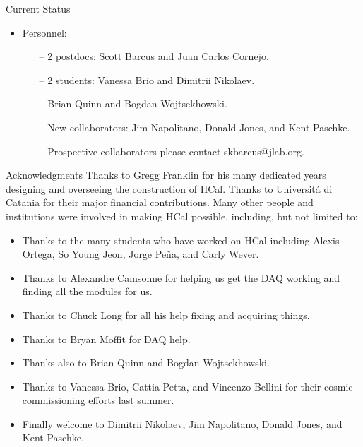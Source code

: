 \documentclass[10pt]{beamer}
\newcommand{\hcal}{HCal}
\begin{document}
\begin{frame}{Current Status}
	\begin{itemize}
		\item \alert{Personnel:}
			\begin{itemize}
				\item[--] 2 postdocs: \alert{Scott Barcus} and \alert{Juan Carlos Cornejo}.
				\item[--] 2 students: \alert{Vanessa Brio} and \alert{Dimitrii Nikolaev}.
				\item[--] \alert{Brian Quinn} and \alert{Bogdan Wojtsekhowski}.
				\item[--] New collaborators: \alert{Jim Napolitano}, \alert{Donald Jones}, and \alert{Kent Paschke}.
				\item[--] Prospective collaborators please contact \alert{skbarcus@jlab.org}.
			\end{itemize}
	\end{itemize}

\end{frame}

\begin{frame}{Acknowledgments}
Thanks to \alert{Gregg Franklin} for his many dedicated years designing and overseeing the construction of {\hcal}. Thanks to \alert{Universit\'{a} di Catania} for their major financial contributions. Many other people and institutions were involved in making {\hcal} possible, including, but not limited to:
    \begin{itemize}
        \item Thanks to the many students who have worked on {\hcal} including \alert{Alexis Ortega}, \alert{So Young Jeon}, \alert{Jorge Pe\~{n}a}, and \alert{Carly Wever}. 
        \item Thanks to \alert{Alexandre Camsonne} for helping us get the DAQ working and finding all the modules for us.
        \item Thanks to \alert{Chuck Long} for all his help fixing and acquiring things.
        \item Thanks to \alert{Bryan Moffit} for DAQ help.
        \item Thanks also to \alert{Brian Quinn} and \alert{Bogdan Wojtsekhowski}.
        \item Thanks to \alert{Vanessa Brio}, \alert{Cattia Petta}, and \alert{Vincenzo Bellini} for their cosmic commissioning efforts last summer.
        \item Finally welcome to \alert{Dimitrii Nikolaev}, \alert{Jim Napolitano}, \alert{Donald Jones}, and \alert{Kent Paschke}.
    \end{itemize}

\end{frame}
\end{document}

